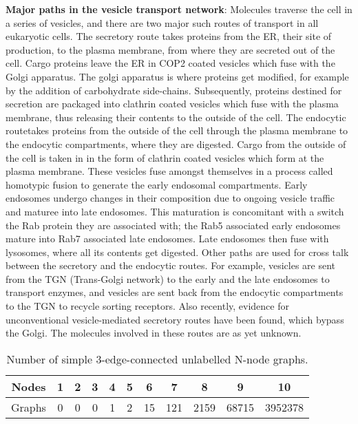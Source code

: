 \textbf{Major paths in the vesicle transport network}:
Molecules traverse the cell in a series of vesicles, and there are two major such routes of transport in all eukaryotic cells.
%
	The secretory route takes proteins from the ER, their site of production, to the plasma membrane, from where they are secreted out of the cell.
	 Cargo proteins leave the ER in COP2 coated vesicles which fuse with the Golgi apparatus.
	  The golgi apparatus is where proteins get modified, for example by the addition of carbohydrate side-chains. 
	  Subsequently, proteins destined for secretion are packaged into clathrin coated vesicles which fuse with the plasma membrane, thus releasing their contents to the outside of the cell\cite{alberts2002molecular}.
 The endocytic routetakes proteins from the outside of the cell through the plasma membrane to the endocytic compartments, where they are digested. 
 Cargo from the outside of the cell is taken in in the form of clathrin coated vesicles which form at the plasma membrane. 
 These vesicles fuse amongst themselves in a process called homotypic fusion to generate the early endosomal compartments. 
 Early endosomes undergo changes in their composition due to ongoing vesicle traffic and maturee into late endosomes. 
 This maturation is concomitant with a switch the Rab protein they are associated with; the Rab5 associated early endosomes mature into Rab7 associated late endosomes\cite{rink2005rab}. Late endosomes then fuse with lysosomes, where all its contents get digested\cite{pryor2009delivery}.
%
Other paths are used for cross talk between the secretory and the endocytic routes. For example, vesicles are sent from the TGN (Trans-Golgi network) to the early and the late endosomes to transport enzymes, and vesicles are sent back from the endocytic compartments to the TGN to recycle sorting receptors\cite{progida2016bidirectional}. Also recently, evidence for unconventional vesicle-mediated secretory routes have been found, which bypass the Golgi. The molecules involved in these routes are as yet unknown\cite{nickel2018unconventional}. 
%

\begin{table}
	\begin{center}
		\begin{tabular}{|c|c|c|c|c|c|c|c|c|c|c|}
			\hline
			Nodes & 1 & 2 & 3 & 4 & 5 & 6 & 7 & 8 & 9 & 10 \\ \hline
			Graphs & 0 & 0 & 0 & 1 & 2 & 15 & 121 & 2159 & 68715 & 3952378 \\ 
			\hline
		\end{tabular}
		\label{tab:threec}
		\caption{Number of simple 3-edge-connected unlabelled N-node graphs.}
	\end{center}	
\end{table}

